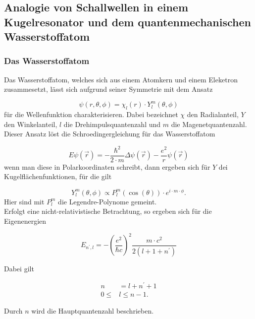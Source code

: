\subsection{Analogie von Schallwellen in einem Kugelresonator und dem quantenmechanischen Wasserstoffatom}
\label{subsec:tch2}

\subsubsection{Das Wasserstoffatom}
\label{subsubsec:tch21}
Das Wasserstoffatom, welches sich aus einem Atomkern und einem Eleketron zusammesetzt, lässt sich aufgrund
seiner Symmetrie mit dem Ansatz

\begin{equation}
  \label{eqn:e1ch2}
  \psi(r,\theta,\phi) = \chi_{l}(r) \cdot Y_{l}^{m}(\theta, \phi)
\end{equation}
für die Wellenfunktion charakterisieren. Dabei bezeichnet $\chi$ den Radialanteil, $Y$ den Winkelanteil, $l$
die Drehimpulsquantenzahl und $m$ die Magenetquantenzahl. Dieser Ansatz löst die Schroedingergleichung für
das Wasserstoffatom

\begin{equation}
  \label{eqn:e2ch2}
  E \psi(\vec r) = - \frac{\hbar^2}{2\cdot m} \Delta  \psi(\vec r) - \frac{e^2}{r} \psi(\vec r)
\end{equation}
wenn man diese in Polarkoordinaten schreibt, dann ergeben sich für $Y$ dei Kugelflächenfunktionen, für die gilt


\begin{equation}
  \label{eqn:e3ch2}
  Y_{l}^{m}(\theta, \phi) \propto P_{l}^{m}(\cos(\theta)) \cdot e^{i\cdot m \cdot \phi}.
\end{equation}
Hier sind mit $P_{l}^{m}$ die Legendre-Polynome gemeint.\\
Erfolgt eine nicht-relativistische Betrachtung, so ergeben sich für die Eigenenergien

\begin{equation}
  \label{eqn:e4ch2}
  E_{n^{'}, l} = -\left( \frac{e^2}{\hbar c} \right)^2 \frac{m \cdot c^2}{2\left(l + 1 + n^{'} \right)}
\end{equation}

Dabei gilt


\begin{align}
  n &= l + n^{'} + 1\\
  0 \leq & l \leq n - 1.
\end{align}

Durch $n$ wird die Hauptquantenzahl beschrieben.


